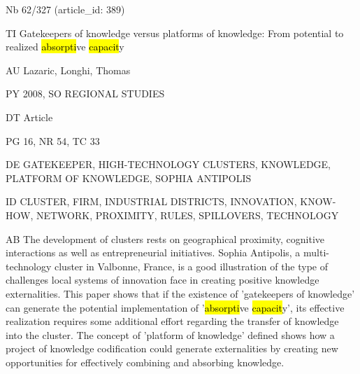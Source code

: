 \documentclass[a4paper]{article}
\begin{document}
\vspace*{-2cm}
Nb \tabto{0cm}62/327 (article\_id: 389)\par
TI \tabto{0cm}Gatekeepers of knowledge versus platforms of knowledge: From potential to realized \hl{absorpti}ve \hl{capacit}y\par
AU \tabto{0cm}Lazaric, Longhi, Thomas\par
PY \tabto{0cm}2008, SO REGIONAL STUDIES\par
DT \tabto{0cm}Article\par
PG \tabto{0cm}16, NR 54, TC 33\par
DE \tabto{0cm}GATEKEEPER, HIGH-TECHNOLOGY CLUSTERS, KNOWLEDGE, PLATFORM OF KNOWLEDGE, SOPHIA ANTIPOLIS\par
ID \tabto{0cm}CLUSTER, FIRM, INDUSTRIAL DISTRICTS, INNOVATION, KNOW-HOW, NETWORK, PROXIMITY, RULES, SPILLOVERS, TECHNOLOGY\par
AB \tabto{0cm}The development of clusters rests on geographical proximity, cognitive interactions as well as entrepreneurial initiatives. Sophia Antipolis, a multi-technology cluster in Valbonne, France, is a good illustration of the type of challenges local systems of innovation face in creating positive knowledge externalities. This paper shows that if the existence of 'gatekeepers of knowledge' can generate the potential implementation of '\hl{absorpti}ve \hl{capacit}y', its effective realization requires some additional effort regarding the transfer of knowledge into the cluster. The concept of 'platform of knowledge' defined shows how a project of knowledge codification could generate externalities by creating new opportunities for effectively combining and absorbing knowledge.\par
\clearpage
\end{document}
